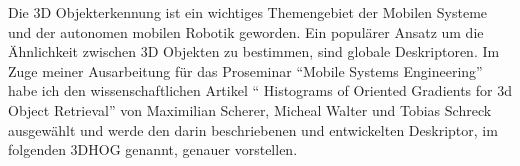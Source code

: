 Die 3D Objekterkennung ist ein wichtiges Themengebiet der Mobilen Systeme und der autonomen mobilen Robotik geworden.
Ein populärer Ansatz um die Ähnlichkeit zwischen 3D Objekten zu bestimmen, sind globale Deskriptoren. Im Zuge
meiner Ausarbeitung für das Proseminar "`Mobile Systems Engineering"' habe ich den wissenschaftlichen Artikel 
"` Histograms of Oriented Gradients for 3d Object Retrieval"' von  Maximilian Scherer, Micheal Walter und Tobias Schreck 
ausgewählt und werde den darin beschriebenen und entwickelten  Deskriptor, im folgenden 3DHOG genannt, genauer vorstellen.